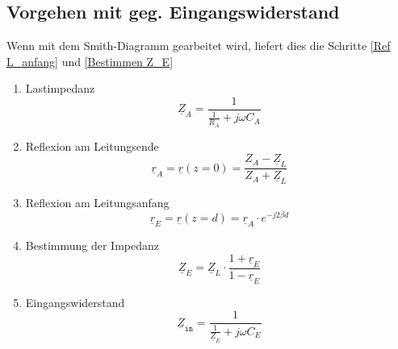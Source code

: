 \subsection{Vorgehen mit geg. Eingangswiderstand}
Wenn mit dem Smith-Diagramm gearbeitet wird, liefert dies die Schritte
\ref{Ref L_anfang} und \ref{Bestimmen Z_E}
\begin{enumerate}
	\item Lastimpedanz
	      \[ \underline{Z}_A = \dfrac{1}{\frac{1}{R_A} + j \omega C_A} \]
	\item Reflexion am Leitungsende
	      \[ \underline{r}_A = \underline{r}(z=0) = \dfrac{Z_A - \underline{Z}_L}{Z_A + \underline{Z}_L} \]
	\item Reflexion am Leitungsanfang \label{Ref L_anfang}
	      \[ \underline{r}_E = \underline{r}(z=d) =  \underline{r}_A \cdot e^{-j 2 \beta d}\]
	\item Bestimmung der Impedanz \label{Bestimmen Z_E}
	      \[ \underline{Z}_E = \underline{Z}_L \cdot \dfrac{1 + \underline{r}_E}{1 - \underline{r}_E}\]
	\item Eingangswiderstand
	      \[ \underline{Z}_{\texttt{in}} = \dfrac{1}{\frac{1}{\underline{Z}_E} + j \omega C_E}\]
\end{enumerate}

